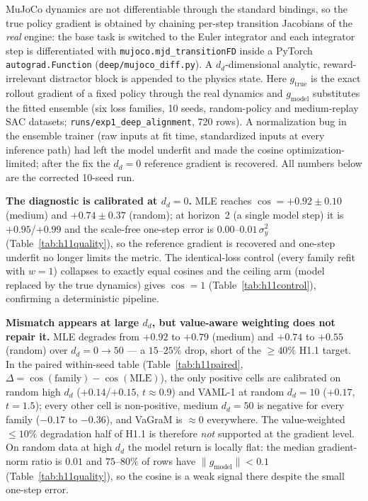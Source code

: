 \documentclass{article}
\theoremstyle{plain}
\begin{document}
MuJoCo dynamics are not differentiable through the standard bindings, so the true policy
gradient is obtained by chaining per-step transition Jacobians of the \emph{real} engine:
the base task is switched to the Euler integrator and each integrator step is
differentiated with \texttt{mujoco.mjd\_transitionFD} inside a PyTorch
\texttt{autograd.Function} (\texttt{deep/mujoco\_diff.py}). A $d_d$-dimensional analytic,
reward-irrelevant distractor block is appended to the physics state. Here
$g_{\text{true}}$ is the exact rollout gradient of a fixed policy through the real
dynamics and $g_{\text{model}}$ substitutes the fitted ensemble (six loss families, 10
seeds, random-policy and medium-replay SAC datasets;
\texttt{runs/exp1\_deep\_alignment}, 720 rows). A normalization bug in the ensemble
trainer (raw inputs at fit time, standardized inputs at every inference path) had left
the model underfit and made the cosine optimization-limited; after the fix the
$d_d = 0$ reference gradient is recovered. All numbers below are the corrected 10-seed
run.



\textbf{The diagnostic is calibrated at $d_d = 0$.} MLE reaches
$\cos = +0.92 \pm 0.10$ (medium) and $+0.74 \pm 0.37$ (random); at horizon~2 (a single
model step) it is $+0.95$/$+0.99$ and the scale-free one-step error is
$0.00$--$0.01\,\sigma_y^2$ (Table~\ref{tab:h11quality}), so the reference gradient is
recovered and one-step underfit no longer limits the metric. The identical-loss control
(every family refit with $w = 1$) collapses to exactly equal cosines and the ceiling arm
(model replaced by the true dynamics) gives $\cos = 1$ (Table~\ref{tab:h11control}),
confirming a deterministic pipeline.

\textbf{Mismatch appears at large $d_d$, but value-aware weighting does not repair it.}
MLE degrades from $+0.92$ to $+0.79$ (medium) and $+0.74$ to $+0.55$ (random) over
$d_d = 0 \to 50$ --- a $15$--$25\%$ drop, short of the $\ge 40\%$ H1.1 target. In the
paired within-seed table (Table~\ref{tab:h11paired},
$\Delta = \cos(\text{family}) - \cos(\text{MLE})$), the only positive cells are calibrated
on random high $d_d$ ($+0.14$/$+0.15$, $t \approx 0.9$) and VAML-1 at random
$d_d = 10$ ($+0.17$, $t = 1.5$); every other cell is non-positive, medium $d_d = 50$ is
negative for every family ($-0.17$ to $-0.36$), and VaGraM is $\approx 0$ everywhere. The
value-weighted $\le 10\%$ degradation half of H1.1 is therefore \emph{not} supported at
the gradient level. On random data at high $d_d$ the model return is locally flat: the
median gradient-norm ratio is $0.01$ and $75$--$80\%$ of rows have
$\lVert g_{\text{model}}\rVert < 0.1$ (Table~\ref{tab:h11quality}), so the cosine is a
weak signal there despite the small one-step error.
\end{document}
